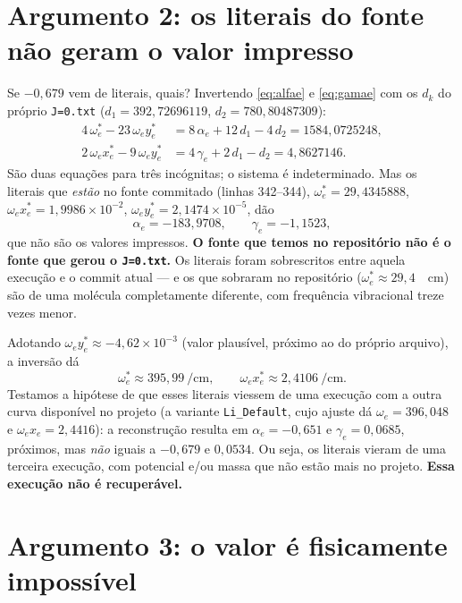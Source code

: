 \documentclass[11pt,a4paper]{article}
\newcommand{\we}{\omega_e}
\newcommand{\wexe}{\omega_e x_e}
\newcommand{\weye}{\omega_e y_e}
\newcommand{\alfae}{\alpha_e}
\newcommand{\gamae}{\gamma_e}
\begin{document}
\section{Argumento 2: os literais do fonte não geram o valor impresso}

Se $-0{,}679$ vem de literais, quais? Invertendo \eqref{eq:alfae} e
\eqref{eq:gamae} com os $d_k$ do próprio \texttt{J=0.txt}
($d_1 = 392{,}72696119$, $d_2 = 780{,}80487309$):
\begin{align}
  4\,\we^{\ast} - 23\,\weye^{\ast} &= 8\,\alfae + 12\,d_1 - 4\,d_2 = 1584{,}0725248, \\
  2\,\wexe^{\ast} - 9\,\weye^{\ast} &= 4\,\gamae + 2\,d_1 - d_2 = 4{,}8627146 .
\end{align}
São duas equações para três incógnitas; o sistema é indeterminado. Mas os
literais que \emph{estão} no fonte commitado (linhas 342--344),
$\we^{\ast}=29{,}4345888$, $\wexe^{\ast}=1{,}9986{\times}10^{-2}$,
$\weye^{\ast}=2{,}1474{\times}10^{-5}$, dão
\begin{equation}
  \alfae = -183{,}9708 , \qquad \gamae = -1{,}1523 ,
\end{equation}
que não são os valores impressos. \textbf{O fonte que temos no repositório não é
o fonte que gerou o \texttt{J=0.txt}.} Os literais foram sobrescritos entre
aquela execução e o commit atual --- e os que sobraram no repositório
($\we^{\ast}\approx29{,}4$~\si{\per\centi\meter}) são de uma molécula
completamente diferente, com frequência vibracional treze vezes menor.

Adotando $\weye^{\ast}\approx-4{,}62{\times}10^{-3}$ (valor plausível, próximo
ao do próprio arquivo), a inversão dá
\begin{equation}
  \we^{\ast} \approx 395{,}99~\si{\per\centi\meter}, \qquad
  \wexe^{\ast} \approx 2{,}4106~\si{\per\centi\meter}.
\end{equation}
Testamos a hipótese de que esses literais viessem de uma execução com a outra
curva disponível no projeto (a variante \texttt{Li\_Default}, cujo ajuste dá
$\we=396{,}048$ e $\wexe=2{,}4416$): a reconstrução resulta em
$\alfae=-0{,}651$ e $\gamae=0{,}0685$, próximos, mas \emph{não} iguais a
$-0{,}679$ e $0{,}0534$. Ou seja, os literais vieram de uma terceira execução,
com potencial e/ou massa que não estão mais no projeto. \textbf{Essa execução
não é recuperável.}

\section{Argumento 3: o valor é fisicamente impossível}
\end{document}
